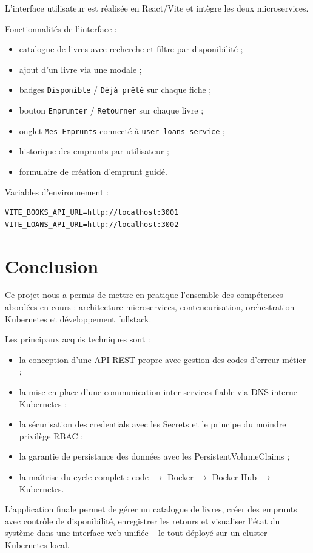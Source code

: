 \documentclass[12pt,a4paper]{article}
\begin{document}
L'interface utilisateur est réalisée en React/Vite et intègre les deux microservices.

Fonctionnalités de l'interface :

\begin{itemize}[leftmargin=*]
  \item catalogue de livres avec recherche et filtre par disponibilité ;
  \item ajout d'un livre via une modale ;
  \item badges \texttt{Disponible} / \texttt{Déjà prêté} sur chaque fiche ;
  \item bouton \texttt{Emprunter} / \texttt{Retourner} sur chaque livre ;
  \item onglet \texttt{Mes Emprunts} connecté à \texttt{user-loans-service} ;
  \item historique des emprunts par utilisateur ;
  \item formulaire de création d'emprunt guidé.
\end{itemize}

Variables d'environnement :

\begin{Verbatim}[breaklines=true,breakanywhere=true]
VITE_BOOKS_API_URL=http://localhost:3001
VITE_LOANS_API_URL=http://localhost:3002
\end{Verbatim}

\section{Conclusion}

Ce projet nous a permis de mettre en pratique l'ensemble des compétences abordées en cours :
architecture microservices, conteneurisation, orchestration Kubernetes et développement fullstack.

Les principaux acquis techniques sont :

\begin{itemize}[leftmargin=*]
  \item la conception d'une API REST propre avec gestion des codes d'erreur métier ;
  \item la mise en place d'une communication inter-services fiable via DNS interne Kubernetes ;
  \item la sécurisation des credentials avec les Secrets et le principe du moindre privilège RBAC ;
  \item la garantie de persistance des données avec les PersistentVolumeClaims ;
  \item la maîtrise du cycle complet : code $\rightarrow$ Docker $\rightarrow$ Docker Hub $\rightarrow$ Kubernetes.
\end{itemize}

L'application finale permet de gérer un catalogue de livres, créer des emprunts avec
contrôle de disponibilité, enregistrer les retours et visualiser l'état du système
dans une interface web unifiée -- le tout déployé sur un cluster Kubernetes local.
\end{document}
